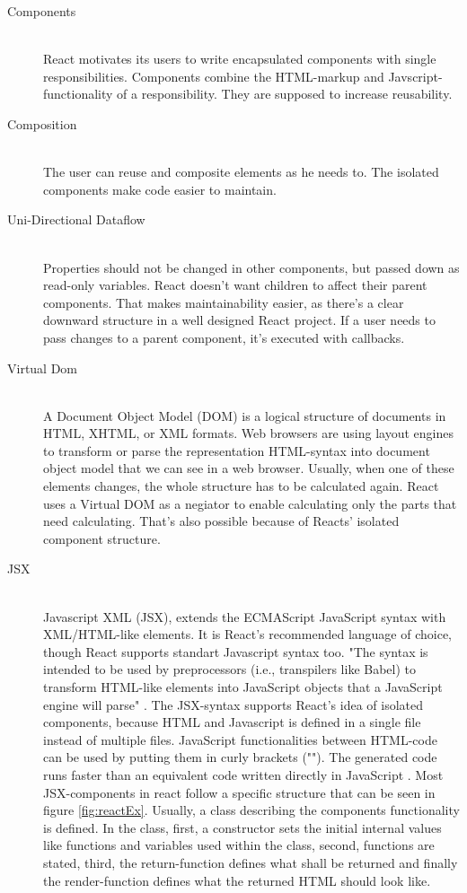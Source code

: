 \begin{description}
    \item[Components] \hfill \\
    React motivates its users to write encapsulated components with single responsibilities. Components combine the HTML-markup and Javscript-functionality of a responsibility. 
    They are supposed to increase reusability. %
    \item[Composition] \hfill \\
    The user can reuse and composite elements as he needs to. 
    The isolated components make code easier to maintain. 
    \item[Uni-Directional Dataflow] \hfill \\
            Properties should not be changed in other components, but passed down as read-only variables. 
            React doesn't want children to affect their parent components. That makes maintainability easier, as there's a clear downward structure in a well designed React project.
            If a user needs to pass changes to a parent component, it's executed with callbacks.
    \item[Virtual Dom]\hfill \\
    A Document Object Model (DOM) is a logical structure of documents in HTML, XHTML, or XML formats. 
    Web browsers are using layout engines to transform or parse the representation HTML-syntax into document object model that we can see in a web browser.
    Usually, when one of these elements changes, the whole structure has to be calculated again. 
    React uses a Virtual DOM as a negiator to enable calculating only the parts that need calculating. That's also possible because of Reacts' isolated component structure.
    \item[JSX] \hfill \\
	Javascript XML (JSX), extends the ECMAScript JavaScript syntax with XML/HTML-like elements.
	It is React's recommended language of choice, though React supports standart Javascript syntax too.
	"The syntax is intended to be used by preprocessors (i.e., transpilers like Babel) to transform HTML-like 
	elements into JavaScript objects that a JavaScript engine will parse" \parencite{jsx2}.
	The JSX-syntax supports React's idea of isolated components, 
	because HTML and Javascript is defined in a single file instead of multiple files.
	JavaScript functionalities between HTML-code can be used by putting them in curly brackets ("{}").
	The generated code runs faster than an equivalent code written directly in JavaScript \parencite{jsx}.
	Most JSX-components in react follow a specific structure that can be seen in figure \ref{fig:reactEx}.
	Usually, a class describing the components functionality is defined.
	In the class, first, a constructor sets the initial internal values like functions and variables used within the class, 
	second, functions are stated, third, the return-function defines what shall be returned and finally the render-function defines what the returned HTML should look like.
\end{description}
